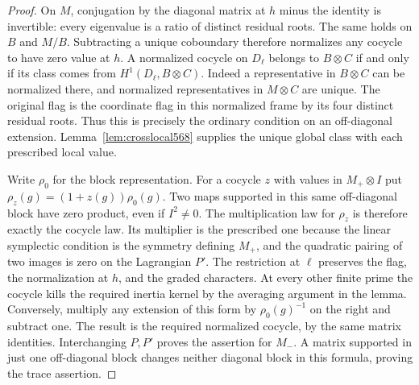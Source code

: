 \documentclass[a4paper,11pt]{article}
\theoremstyle{definition}
\theoremstyle{remark}
\numberwithin{equation}{section}
\begin{document}
\begin{proof}
On \(M\), conjugation by the diagonal matrix at \(h\) minus
the identity is invertible: every eigenvalue is a ratio of
distinct residual roots. The same holds on \(B\) and \(M/B\).
Subtracting a unique coboundary therefore normalizes any
cocycle to have zero value at \(h\). A normalized cocycle
on \(D_\ell\) belongs to \(B\otimes C\) if and only if its
class comes from \(H^1(D_\ell,B\otimes C)\). Indeed a
representative in \(B\otimes C\) can be normalized there,
and normalized representatives in \(M\otimes C\) are unique.
The original flag is the coordinate flag in this normalized
frame by its four distinct residual roots. Thus this is
precisely the ordinary condition on an off-diagonal
extension. Lemma~\ref{lem:crosslocal568} supplies the unique
global class with each prescribed local value.

Write \(\rho_0\) for the block representation. For a cocycle
\(z\) with values in \(M_+\otimes I\) put
\(\rho_z(g)=(1+z(g))\rho_0(g)\). Two maps supported in
this same off-diagonal block have zero product, even if
\(I^2\ne0\). The multiplication law for \(\rho_z\) is
therefore exactly the cocycle law. Its multiplier is the
prescribed one because the linear symplectic condition is
the symmetry defining \(M_+\), and the quadratic pairing
of two images is zero on the Lagrangian \(P'\).
The restriction at \(\ell\) preserves the flag, the
normalization at \(h\), and the graded characters. At
every other finite prime the cocycle kills the required
inertia kernel by the averaging argument in the lemma.
Conversely, multiply any extension of this form by
\(\rho_0(g)^{-1}\) on the right and subtract one. The
result is the required normalized cocycle, by the same
matrix identities. Interchanging \(P,P'\) proves the
assertion for \(M_-\). A matrix supported in just one
off-diagonal block changes neither diagonal block in this
formula, proving the trace assertion.
\end{proof}
\end{document}
